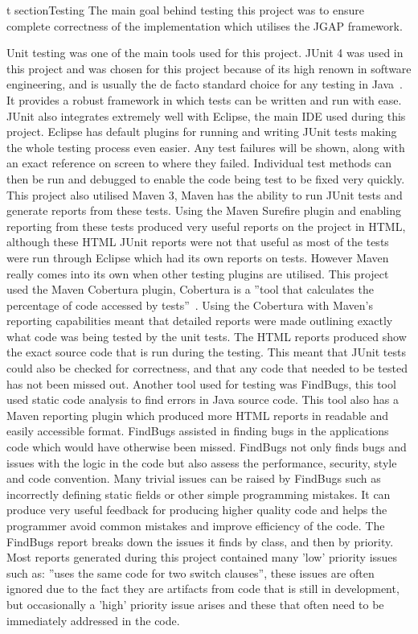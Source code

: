 \documentclass[12pt]{article}
\begin{document}
t
section{Testing}
The main goal behind testing this project was to ensure complete correctness of the implementation which utilises the JGAP framework.

Unit testing was one of the main tools used for this project. JUnit 4 was used in this project and was chosen for this project because
of its high renown in software engineering, and is usually the de facto standard choice for any testing in Java~\cite{massol04}. It provides a robust framework
in which tests can be written and run with ease. JUnit also integrates extremely well with Eclipse, the main IDE used during this project. Eclipse has default plugins for running and writing JUnit tests making the whole testing process even easier. Any test
failures will be shown, along with an exact reference on screen to where they failed. Individual test methods can then be run and
debugged to enable the code being test to be fixed very quickly.
This project also utilised Maven 3, Maven has the ability to run JUnit tests and generate reports from these tests. Using the Maven
Surefire plugin and enabling reporting from these tests produced very useful reports on the project in HTML, although these HTML 
JUnit reports were not that useful as most of the tests were run through Eclipse which had its own reports on tests.
However Maven really comes into its own when other testing plugins are
utilised. This project used the Maven Cobertura plugin, Cobertura is a ''tool that calculates the percentage of code accessed by 
tests''~\cite{cobertura}. Using the Cobertura with Maven's reporting capabilities meant that detailed reports were made 
outlining exactly what code was being tested by the unit tests. The HTML reports produced show the exact source code that is run during the
testing. This meant that JUnit tests could also be checked for correctness, and that any code that needed to be tested has not been
missed out.
Another tool used for testing was FindBugs, this tool used static code analysis to find errors in Java source code. This tool also
has a Maven reporting plugin which produced more HTML reports in readable and easily accessible format. FindBugs assisted in finding bugs in the 
applications code which would have otherwise been missed. FindBugs not only finds bugs and issues with the logic in the code
but also assess the performance, security, style and code convention. Many trivial issues can be raised by FindBugs such as 
incorrectly defining static fields or other simple programming mistakes. It can produce very useful feedback for producing
higher quality code and helps the programmer avoid common mistakes and improve efficiency of the code. The FindBugs report breaks
down the issues it finds by class, and then by priority. Most reports generated during this project contained many 'low' priority
issues such as: ''uses the same code for two switch clauses'', these issues are often ignored due to the fact they are artifacts
from code that is still in development, but occasionally a 'high' priority issue arises and these that often need to be immediately
addressed in the code. 
\end{document}
